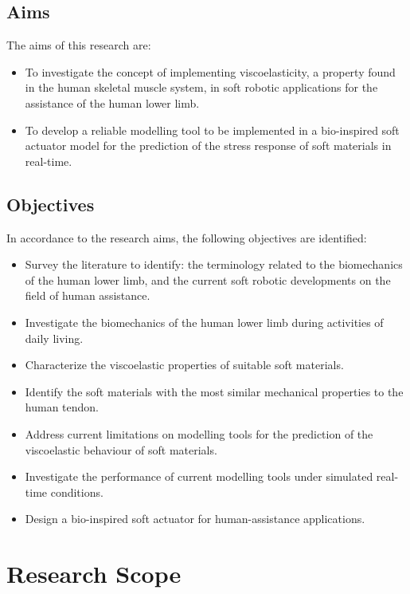 \subsection{Aims}

The aims of this research are:

\begin{itemize}
    \item To investigate the concept of implementing viscoelasticity, a property found in the human skeletal muscle system, in soft robotic applications for the assistance of the human lower limb.
    \item To develop a reliable modelling tool to be implemented in a bio-inspired soft actuator model for the prediction of the stress response of soft materials in real-time.
\end{itemize}

\subsection{Objectives}

In accordance to the research aims, the following objectives are identified:

\begin{itemize}
    \item Survey the literature to identify: the terminology related to the biomechanics of the human lower limb, and the current soft robotic developments on the field of human assistance.
    \item Investigate the biomechanics of the human lower limb during activities of daily living.
    \item Characterize the viscoelastic properties of suitable soft materials.
    \item Identify the soft materials with the most similar mechanical properties to the human tendon.
    \item Address current limitations on modelling tools for the prediction of the viscoelastic behaviour of soft materials.
    \item Investigate the performance of current modelling tools under simulated real-time conditions.
    \item Design a bio-inspired soft actuator for human-assistance applications.
\end{itemize}

\section{Research Scope}

